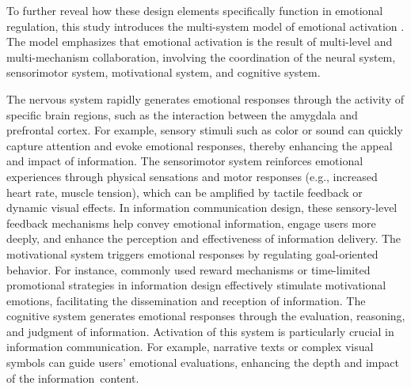To further reveal how these design elements specifically function in emotional regulation, this study introduces the multi-system model of emotional activation \cite{izard1993four}. The model emphasizes that emotional activation is the result of multi-level and multi-mechanism collaboration, involving the coordination of the neural system, sensorimotor system, motivational system, and cognitive system.


The nervous system rapidly generates emotional responses through the activity of specific brain regions, such as the interaction between the amygdala and prefrontal cortex. For example, sensory stimuli such as color\cite{pazda2024colorfulness} or sound\cite{clewett2024emotional} can quickly capture attention and evoke emotional responses, thereby enhancing the appeal and impact of information. The sensorimotor system reinforces emotional experiences through physical sensations and motor responses (e.g., increased heart rate, muscle tension), which can be amplified by tactile feedback\cite{olugbade2023touch} or dynamic visual effects\cite{amoor2014designing}. In information communication design, these sensory-level feedback mechanisms help convey emotional information, engage users more deeply, and enhance the perception and effectiveness of information delivery. The motivational system triggers emotional responses by regulating goal-oriented behavior. For instance, commonly used reward mechanisms or time-limited promotional strategies in information design effectively stimulate motivational emotions, facilitating the dissemination and reception of information. The cognitive system generates emotional responses through the evaluation, reasoning, and judgment of information. Activation of this system is particularly crucial in information communication. For example, narrative texts \cite{mar2011emotion, lekkas2022using} or complex visual symbols \cite{ferrara2015measuring, mayer2014benefits} can guide users’ emotional evaluations, enhancing the depth and impact of the information~content.


